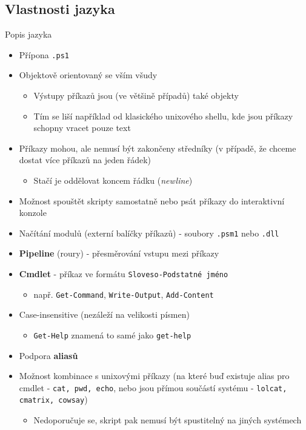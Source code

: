 \documentclass[main.tex]{subfiles}
\begin{document}
\subsection{Vlastnosti jazyka}
\begin{frame}[allowframebreaks]{Popis jazyka}
  \begin{itemize}
    \item Přípona \texttt{.ps1}
    \item Objektově orientovaný se vším všudy
      \begin{itemize}
        \item Výstupy příkazů jsou (ve většině případů) také objekty
        \item Tím se liší například od klasického unixového shellu, kde jsou příkazy schopny vracet pouze text
      \end{itemize}
    \item Příkazy mohou, ale nemusí být zakončeny středníky (v případě, že chceme dostat více příkazů na jeden řádek)
      \begin{itemize}
        \item Stačí je oddělovat koncem řádku (\textit{newline})
      \end{itemize}
    \item Možnost spouštět skripty samostatně nebo psát příkazy do interaktivní konzole
    \item Načítání modulů (externí balíčky příkazů) - soubory \texttt{.psm1} nebo \texttt{.dll}
  \end{itemize}
      \framebreak
      \begin{itemize}
    \item \textbf{Pipeline} (roury) - přesměrování vstupu mezi příkazy
    \item \textbf{Cmdlet} - příkaz ve formátu \texttt{Sloveso-Podstatné jméno}
      \begin{itemize}
        \item např. \texttt{Get-Command}, \texttt{Write-Output}, \texttt{Add-Content}
      \end{itemize}
    \item Case-insensitive (nezáleží na velikosti písmen)
      \begin{itemize}
        \item \texttt{Get-Help} znamená to samé jako \texttt{get-help}
      \end{itemize}
    \item Podpora \textbf{aliasů}
    \item Možnost kombinace s unixovými příkazy (na které buď existuje alias pro cmdlet - \texttt{cat, pwd, echo}, nebo jsou přímou součástí systému - \texttt{lolcat, cmatrix, cowsay})
      \begin{itemize}
        \item Nedoporučuje se, skript pak nemusí být spustitelný na jiných systémech
      \end{itemize}

  \end{itemize} 
\end{frame}
\end{document}
